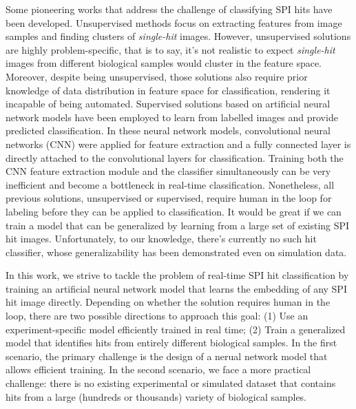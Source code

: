Some pioneering works that address the challenge of classifying SPI hits have
been developed.  Unsupervised methods
\cite{yoonUnsupervisedClassificationSingleparticle2011,
giannakisSymmetriesImageFormation2012,schwanderSymmetriesImageFormation2012,
yoonNovelAlgorithmsCoherent2012,
andreassonAutomatedIdentificationClassification2014,
bobkovSortingAlgorithmsSingleparticle2015} focus on extracting features from
image samples and finding clusters of \textit{single-hit} images.  However,
unsupervised solutions are highly problem-specific, that is to say, it's not
realistic to expect \textit{single-hit} images from different biological samples
would cluster in the feature space.  Moreover, despite being unsupervised, those
solutions also require prior knowledge of data distribution in feature space for
classification, rendering it incapable of being automated. Supervised solutions
based on artificial neural network models
\cite{shiEvaluationPerformanceClassification2019,
ignatenkoClassificationDiffractionPatterns2021} have been employed to learn from
labelled images and provide predicted classification.  In these neural network
models, convolutional neural networks (CNN) were applied for feature extraction
and a fully connected layer is directly attached to the convolutional layers for
classification.  Training both the CNN feature extraction module and the
classifier simultaneously can be very inefficient and become a bottleneck in
real-time classification.  Nonetheless, all previous solutions, unsupervised or
supervised, require human in the loop for labeling before they can be applied to
classification.  It would be great if we can train a model that can be
generalized by learning from a large set of existing SPI hit images.
Unfortunately, to our knowledge, there's currently no such hit classifier, whose
generalizability has been demonstrated even on simulation data.  



In this work, we strive to tackle the problem of real-time SPI hit
classification by training an artificial neural network model that learns the
embedding of any SPI hit image directly.  Depending on whether the solution
requires human in the loop, there are two possible directions to approach this
goal: (1) Use an experiment-specific model efficiently trained in real time; (2)
Train a generalized model that identifies hits from entirely different
biological samples. In the first scenario, the primary challenge is the design
of a nerual network model that allows efficient training.  In the second
scenario, we face a more practical challenge: there is no existing experimental
or simulated dataset that contains hits from a large (hundreds or thousands)
variety of biological samples.  

